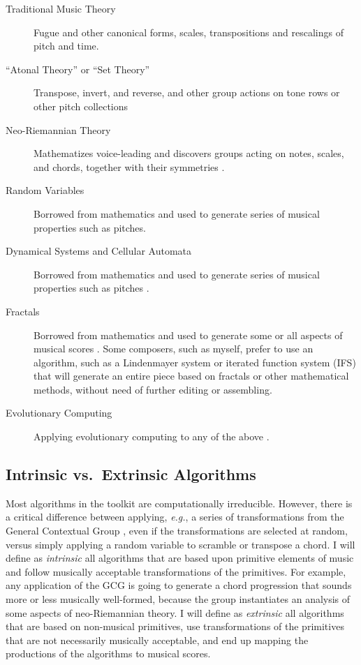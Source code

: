 \documentclass[11pt]{scrartcl}
\begin{document}
\begin{description}
\item[Traditional Music Theory] Fugue and other canonical forms, scales, transpositions and rescalings of pitch and time.
\item[``Atonal Theory'' or ``Set Theory''] Transpose, invert, and reverse, and other group actions on tone rows or other pitch collections \parencite{rahn1991basic}
\item[Neo-Riemannian Theory] Mathematizes voice-leading and discovers groups acting on notes, scales, and chords, together with their symmetries \parencite{geometryofchords, tymoczko2006geometry, callender2008generalized}.
\item[Random Variables] Borrowed from mathematics and used to generate series of musical properties such as pitches.
\item[Dynamical Systems and Cellular Automata] Borrowed from mathematics and used to generate series of musical properties such as pitches \parencite{Miranda1993}.
\item[Fractals] Borrowed from mathematics and used to generate some or all aspects of musical scores \parencite{miranda2001composing, madden2007fractals}. Some composers, such as myself, prefer to use an algorithm, such as a Lindenmayer system \parencite{algorithmicbeautyofplants, prusinkiewicz1986sgs,  fractalmusicwithstringrewritinggrammars} or iterated function system (IFS) \parencite{fractalseverywhere, ifsmusic} that will generate an entire piece based on fractals or other mathematical methods, without need of further editing or assembling. 
\item[Evolutionary Computing] Applying evolutionary computing to any of the above \parencite{miranda2007evolutionary}.
\end{description}

\subsection*{Intrinsic vs.\ Extrinsic Algorithms}

Most algorithms in the toolkit are computationally irreducible. However, there is a critical difference between applying, \emph{e.g.}, a series of transformations from the General Contextual Group \parencite{fiore2005gcg}, even if the transformations are selected at random, versus simply applying a random variable to scramble or transpose a chord. I will define as \emph{intrinsic} all algorithms that are based upon primitive elements of music and follow musically acceptable transformations of the primitives. For example, any application of the GCG is going to generate a chord progression that sounds more or less musically well-formed, because the group instantiates an analysis of some aspects of neo-Riemannian theory. I will define as \emph{extrinsic} all algorithms that are based on non-musical primitives, use transformations of the primitives that are not necessarily musically acceptable, and end up mapping the productions of the algorithms to musical scores.
\end{document}
